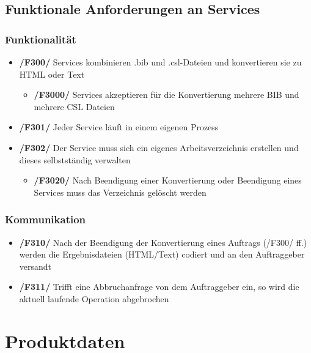 \documentclass[11pt]{article} %
\begin{document}
\subsection{Funktionale Anforderungen an Services}

\subsubsection{Funktionalität}

\begin{itemize}
\item{\textbf{/F300/} Services kombinieren .bib und .csl-Dateien und konvertieren sie zu HTML oder Text}

\begin{itemize}
\item{\textbf{/F3000/} Services akzeptieren für die Konvertierung mehrere BIB und mehrere CSL Dateien}
\end{itemize}

\item{\textbf{/F301/} Jeder Service läuft in einem eigenen Prozess}
\item{\textbf{/F302/} Der Service muss sich ein eigenes Arbeitsverzeichnis erstellen und dieses selbstständig verwalten}

\begin{itemize}
\item{\textbf{/F3020/} Nach Beendigung einer Konvertierung oder Beendigung eines Services muss das Verzeichnis gelöscht werden}
\end{itemize}

\end{itemize}

\subsubsection{Kommunikation}

\begin{itemize}
\item{\textbf{/F310/} Nach der Beendigung der Konvertierung eines Auftrags (/F300/ ff.) werden die Ergebnisdateien (HTML/Text) codiert und an den Auftraggeber versandt}
\item{\textbf{/F311/} Trifft eine Abbruchanfrage von dem Auftraggeber ein, so wird die aktuell laufende Operation abgebrochen}
\end{itemize}

\clearpage

\section{Produktdaten}
\end{document}
